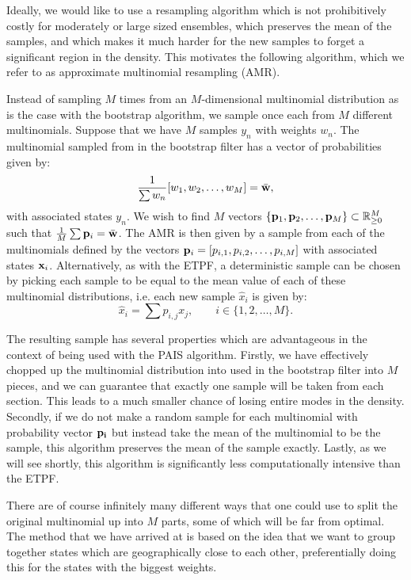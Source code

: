 \documentclass[final]{siamltex}
\begin{document}
Ideally, we would like to use a resampling algorithm which is not
prohibitively costly for moderately or large sized ensembles,
which preserves the mean of the samples, and which makes it much
harder for the new samples to forget a significant region in the
density. This motivates the following algorithm, which we refer to as
approximate multinomial resampling (AMR).

Instead of sampling $M$ times from an $M$-dimensional multinomial
distribution as is the case with the bootstrap algorithm, we sample
once each from $M$ different multinomials. Suppose that we have $M$
samples $y_n$ with weights $w_n$. The multinomial sampled from in the
bootstrap filter has a vector of probabilities given by:
\begin{equation*}
\frac{1}{\sum w_n} [w_1,w_2,\ldots,w_M] = \bar{\bf w},
\end{equation*}
with associated states $y_n$.
We wish to find $M$ vectors $\{{\bf p}_1,{\bf p}_2,\ldots,{\bf p}_M\}
\subset \mathbb{R}^M_{\ge 0}$
such that  $\frac{1}{M} \sum {\bf p}_i = \bar{\bf w}$. The AMR is then
given by a sample from each of the multinomials defined by the vectors
${\bf p}_i = [p_{i,1},p_{i,2},\ldots,p_{i,M}]$ with associated states ${\bf x}_i$. Alternatively, as with the ETPF, a deterministic sample
can be chosen by picking each sample to be equal to the mean value of
each of these multinomial distributions, i.e. each new sample
$\hat{x}_i$ is given by:
\begin{equation}
\hat{x}_i = \sum p_{i,j} x_j, \qquad i \in \{1,2,\ldots,M\}.
\end{equation}

The resulting sample has several properties which are advantageous in
the context of being used with the PAIS algorithm. Firstly, we have
effectively chopped up the multinomial distribution into used in the
bootstrap filter into $M$ pieces, and we can guarantee that exactly
one sample will be taken from each section. This leads to a much
smaller chance of losing entire modes in the density. Secondly, if we do not make a random sample for
each multinomial with probability vector $\bf p_i$ but instead take
the mean of the multinomial to be the sample, this algorithm preserves
the mean of the sample exactly. Lastly, as we will see shortly, this
algorithm is significantly less computationally intensive than the
ETPF.

There are of course infinitely many different ways that one could use
to split the original multinomial up into $M$ parts, some of which
will be far from optimal. The method that we have arrived at is based
on the idea that we want to group together states which are
geographically close to each other, preferentially doing this 
for the states with the biggest weights. 
\end{document}
